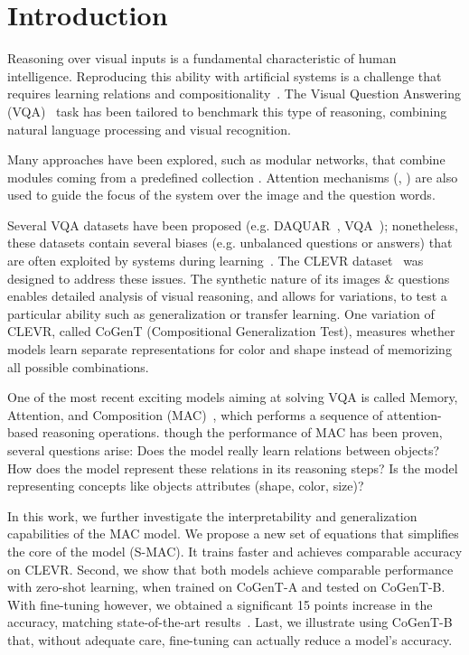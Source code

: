 \section{Introduction}
Reasoning over visual inputs is a fundamental characteristic of human intelligence.
Reproducing this ability with artificial systems is a challenge that requires learning relations and compositionality~\citep{hu2017learning, johnson2017inferring}. The Visual Question Answering (VQA)~\citep{antol2015vqa,malinowski2014towards,wu2017visual} task has been tailored to benchmark this type of reasoning, combining natural language processing and visual recognition.

Many approaches have been explored, such as modular networks, that combine modules coming from a predefined collection \cite{andreas2016learning,johnson2017inferring, mascharka2018transparency}. Attention mechanisms (\cite{bahdanau2014neural}, \cite{xu2015show}) are also used to guide the focus of the system over the image and the question words.

Several VQA datasets have been proposed (e.g. DAQUAR~\citep{malinowski2014multi}, VQA~\citep{antol2015vqa}); nonetheless, these datasets contain several biases (e.g. unbalanced questions or answers) that are often exploited by systems during learning~\citep{goyal2017making}.
The CLEVR dataset~\citep{johnson2017clevr} was designed to address these issues. The synthetic nature of its images \& questions enables detailed analysis of visual reasoning, and allows for variations, to test a particular ability such as generalization or transfer learning. One variation of CLEVR, called CoGenT (Compositional Generalization Test), measures whether models learn separate representations for color and shape instead of memorizing all possible combinations.


One of the most recent exciting models aiming at solving VQA is called Memory, Attention, and Composition (MAC)~\citep{hudson2018compositional}, which performs a sequence of attention-based reasoning operations. 
though the performance of MAC has been proven, several questions arise:
Does the model really learn relations between objects? 
How does the model represent these relations in its reasoning steps? 
Is the model representing concepts like objects attributes (shape, color, size)?

In this work, we further investigate the interpretability and generalization capabilities of the MAC model.
We propose a new set of equations that simplifies the core of the model (S-MAC). It trains faster and achieves comparable accuracy on CLEVR. 
Second, we show that both models achieve comparable performance with zero-shot learning, when trained on CoGenT-A and tested on CoGenT-B. With fine-tuning however, we obtained a significant 15 points increase in the accuracy, matching state-of-the-art results~\cite{perez2017film, mascharka2018transparency}.
Last, we illustrate using CoGenT-B that, without adequate care, fine-tuning can actually reduce a model's accuracy.